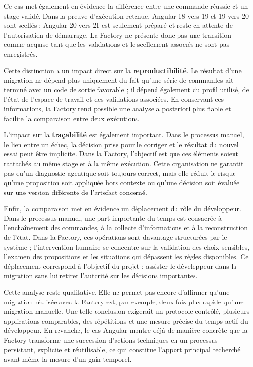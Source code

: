 Ce cas met également en évidence la différence entre une commande réussie et un stage validé. Dans la preuve d'exécution retenue, Angular 18 vers 19 et 19 vers 20 sont scellés ; Angular 20 vers 21 est seulement préparé et reste en attente de l'autorisation de démarrage. La Factory ne présente donc pas une transition comme acquise tant que les validations et le scellement associés ne sont pas enregistrés.

Cette distinction a un impact direct sur la \textbf{reproductibilité}. Le résultat d'une migration ne dépend plus uniquement du fait qu'une série de commandes ait terminé avec un code de sortie favorable ; il dépend également du profil utilisé, de l'état de l'espace de travail et des validations associées. En conservant ces informations, la Factory rend possible une analyse a posteriori plus fiable et facilite la comparaison entre deux exécutions.

L'impact sur la \textbf{traçabilité} est également important. Dans le processus manuel, le lien entre un échec, la décision prise pour le corriger et le résultat du nouvel essai peut être implicite. Dans la Factory, l'objectif est que ces éléments soient rattachés au même stage et à la même exécution. Cette organisation ne garantit pas qu'un diagnostic agentique soit toujours correct, mais elle réduit le risque qu'une proposition soit appliquée hors contexte ou qu'une décision soit évaluée sur une version différente de l'artefact concerné.

Enfin, la comparaison met en évidence un déplacement du rôle du développeur. Dans le processus manuel, une part importante du temps est consacrée à l'enchaînement des commandes, à la collecte d'informations et à la reconstruction de l'état. Dans la Factory, ces opérations sont davantage structurées par le système ; l'intervention humaine se concentre sur la validation des choix sensibles, l'examen des propositions et les situations qui dépassent les règles disponibles. Ce déplacement correspond à l'objectif du projet : assister le développeur dans la migration sans lui retirer l'autorité sur les décisions importantes.

Cette analyse reste qualitative. Elle ne permet pas encore d'affirmer qu'une migration réalisée avec la Factory est, par exemple, deux fois plus rapide qu'une migration manuelle. Une telle conclusion exigerait un protocole contrôlé, plusieurs applications comparables, des répétitions et une mesure précise du temps actif du développeur. En revanche, le cas Angular montre déjà de manière concrète que la Factory transforme une succession d'actions techniques en un processus persistant, explicite et réutilisable, ce qui constitue l'apport principal recherché avant même la mesure d'un gain temporel.

